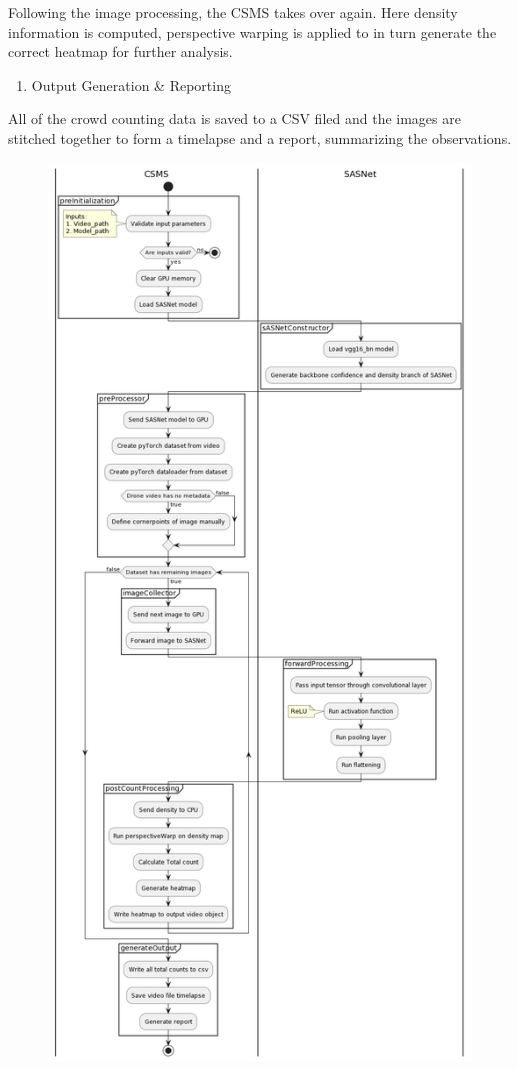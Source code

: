 \documentclass[
]{article}
\providecommand{\tightlist}{%
  \setlength{\itemsep}{0pt}\setlength{\parskip}{0pt}}\usepackage{longtable,booktabs,array}
\begin{document}
Following the image processing, the CSMS takes over again. Here density
information is computed, perspective warping is applied to in turn
generate the correct heatmap for further analysis.

\begin{enumerate}
\def\labelenumi{\arabic{enumi}.}
\setcounter{enumi}{5}
\tightlist
\item
  Output Generation \& Reporting
\end{enumerate}

All of the crowd counting data is saved to a CSV filed and the images
are stitched together to form a timelapse and a report, summarizing the
observations.

\begin{figure}

{\centering \includegraphics{../images/activity-diagram-1.png}

}
\end{figure}
\end{document}
